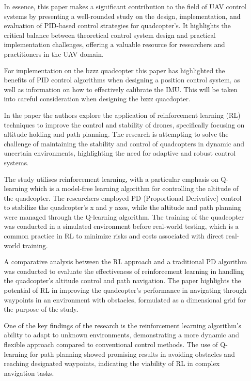 \documentclass{report}
\begin{document}
In essence, this paper makes a significant contribution to the field of UAV
control systems by presenting a well-rounded study on the design,
implementation, and evaluation of PID-based control strategies for quadcopter's.
It highlights the critical balance between theoretical control system design and
practical implementation challenges, offering a valuable resource for
researchers and practitioners in the UAV domain.

For implementation on the bzzz quadcopter this paper has highlighted the
benefits of PID control algorithms when designing a position control system, as
well as information on how to effectively calibrate the IMU. This will be taken
into careful consideration when designing the bzzz quacdopter.

In the paper \cite{ReinforcementLearning} the authors  explore the application of reinforcement
learning (RL) techniques to improve the control and stability of drones,
specifically focusing on altitude holding and path planning. The research is
attempting to solve the challenge of maintaining the stability and control of
quadcopters in dynamic and uncertain environments, highlighting the need for
adaptive and robust control systems.

The study utilises reinforcement learning, with a particular emphasis on
Q-learning which is a model-free learning algorithm for controlling the altitude
of the quadcopter. The researchers employed PD (Proportional-Derivative) control
to stabilize the quadcopter's x and y axes, while the altitude and path planning
were managed through the Q-learning algorithm. The training of the quadcopter
was conducted in a simulated environment before real-world testing, which is a
common practice in RL to minimize risks and costs associated with direct
real-world training.

A comparative analysis between the RL approach and a traditional PD algorithm
was conducted to evaluate the effectiveness of reinforcement learning in
handling the quadcopter's altitude control and path navigation. The paper
highlights the potential of RL in improving the quadcopter's performance in
navigating through waypoints in an environment with obstacles, formulated as a
dimensional grid for the purpose of the study.

One of the key findings of the research is the reinforcement learning
algorithm's ability to adapt to unknown environments, demonstrating a more
dynamic and flexible approach compared to conventional control methods. The use
of Q-learning for path planning showed promising results in avoiding obstacles
and reaching designated waypoints, indicating the viability of RL in complex
navigation tasks.
\end{document}

